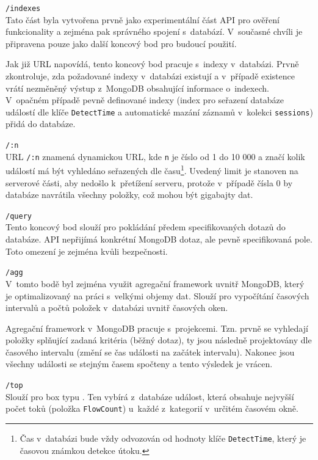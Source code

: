 \begin{description}
    \item \texttt{/indexes} \\
        Tato část byla vytvořena prvně jako experimentální část API pro ověření funkcionality a zejména pak správného spojení s~databází. V~současné chvíli je připravena pouze jako další koncový bod pro budoucí použití.

        Jak již URL napovídá, tento koncový bod pracuje s~indexy v~databázi. Prvně zkontroluje, zda požadované indexy v~databázi existují a v~případě existence vrátí nezměněný výstup z~MongoDB obsahující informace o~indexech. V~opačném případě pevně definované indexy (index pro seřazení databáze událostí dle klíče \texttt{DetectTime} a automatické mazání záznamů v~kolekci \texttt{sessions}) přidá do databáze.
        
    \item \texttt{/:n}\\
        URL \texttt{/:n} znamená dynamickou URL, kde \texttt{n} je číslo od 1 do 10 000 a značí kolik událostí má být vyhledáno seřazených dle času\footnote{Čas v~databázi bude vždy odvozován od hodnoty klíče \texttt{DetectTime}, který je časovou známkou detekce útoku.}. Uvedený limit je stanoven na serverové části, aby nedošlo k~přetížení serveru, protože v~případě čísla 0 by databáze navrátila všechny položky, což mohou být gigabajty dat.

    \item \texttt{/query}\\
        Tento koncový bod slouží pro pokládání předem specifikovaných dotazů do databáze. API nepřijímá konkrétní MongoDB dotaz, ale pevně specifikovaná pole. Toto omezení je zejména kvůli bezpečnosti. 

    \item \texttt{/agg}\\
        V~tomto bodě byl zejména využit agregační framework uvnitř MongoDB, který je optimalizovaný na práci s~velkými objemy dat. Slouží pro vypočítání časových intervalů a počtů položek v~databázi uvnitř časových oken.

        Agregační framework v~MongoDB pracuje s~projekcemi. Tzn. prvně se vyhledají položky splňující zadaná kritéria (běžný dotaz), ty jsou následně projektovány dle časového intervalu (změní se čas události na začátek intervalu). Nakonec jsou všechny události se stejným časem spočteny a tento výsledek je vrácen.

    \item \texttt{/top}\\
        Slouží pro box typu . Ten vybírá z~databáze událost, která obsahuje nejvyšší počet toků (položka \texttt{FlowCount}) u~každé z~kategorií v~určitém časovém okně.


\end{description}
